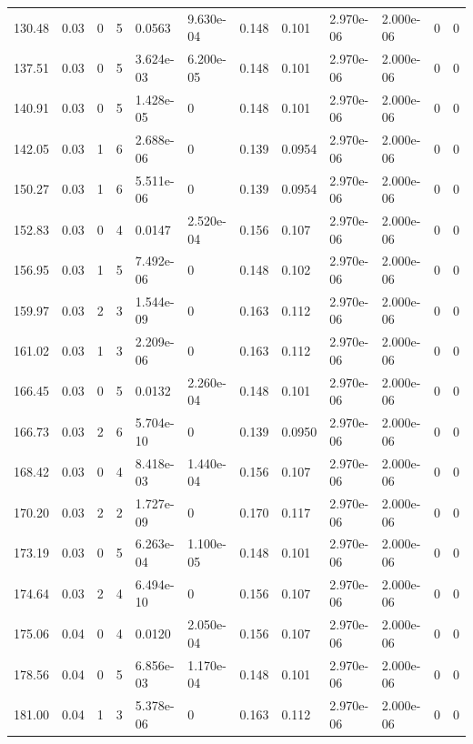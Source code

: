 \documentclass[preview]{standalone}
\begin{document}
{{{\begin{tabular}{L{1.2cm}C{1.2cm} C{0.3cm}C{0.5cm} C{1.4cm}C{1.4cm} C{1.4cm}C{1.4cm} C{1.6cm}C{1.6cm} C{1.6cm}C{1.6cm}}
  130.48  &  0.03  & 0     &  5 &  0.0563  & 9.630e-04  &  0.148&   0.101& 2.970e-06 & 2.000e-06   &  0 & 0  \\ 
  137.51  &  0.03  & 0     &  5 &  3.624e-03  & 6.200e-05  &  0.148&   0.101& 2.970e-06 & 2.000e-06   &  0 & 0  \\ 
  140.91  &  0.03  & 0     &  5 &  1.428e-05  & 0  &  0.148&   0.101& 2.970e-06 & 2.000e-06   &  0 & 0  \\ 
  142.05  &  0.03  & 1     &  6 &  2.688e-06  & 0  &  0.139&   0.0954& 2.970e-06 & 2.000e-06   &  0 & 0  \\ 
  150.27  &  0.03  & 1     &  6 &  5.511e-06  & 0  &  0.139&   0.0954& 2.970e-06 & 2.000e-06   &  0 & 0  \\ 
  152.83  &  0.03  & 0     &  4 &  0.0147  & 2.520e-04  &  0.156&   0.107& 2.970e-06 & 2.000e-06   &  0 & 0  \\ 
  156.95  &  0.03  & 1     &  5 &  7.492e-06  & 0  &  0.148&   0.102& 2.970e-06 & 2.000e-06   &  0 & 0  \\ 
  159.97  &  0.03  & 2     &  3 &  1.544e-09  & 0  &  0.163&   0.112& 2.970e-06 & 2.000e-06   &  0 & 0  \\ 
  161.02  &  0.03  & 1     &  3 &  2.209e-06  & 0  &  0.163&   0.112& 2.970e-06 & 2.000e-06   &  0 & 0  \\ 
  166.45  &  0.03  & 0     &  5 &  0.0132  & 2.260e-04  &  0.148&   0.101& 2.970e-06 & 2.000e-06   &  0 & 0  \\ 
  166.73  &  0.03  & 2     &  6 &  5.704e-10  & 0  &  0.139&   0.0950& 2.970e-06 & 2.000e-06   &  0 & 0  \\ 
  168.42  &  0.03  & 0     &  4 &  8.418e-03  & 1.440e-04  &  0.156&   0.107& 2.970e-06 & 2.000e-06   &  0 & 0  \\ 
  170.20  &  0.03  & 2     &  2 &  1.727e-09  & 0  &  0.170&   0.117& 2.970e-06 & 2.000e-06   &  0 & 0  \\ 
  173.19  &  0.03  & 0     &  5 &  6.263e-04  & 1.100e-05  &  0.148&   0.101& 2.970e-06 & 2.000e-06   &  0 & 0  \\ 
  174.64  &  0.03  & 2     &  4 &  6.494e-10  & 0  &  0.156&   0.107& 2.970e-06 & 2.000e-06   &  0 & 0  \\ 
  175.06  &  0.04  & 0     &  4 &  0.0120  & 2.050e-04  &  0.156&   0.107& 2.970e-06 & 2.000e-06   &  0 & 0  \\ 
  178.56  &  0.04  & 0     &  5 &  6.856e-03  & 1.170e-04  &  0.148&   0.101& 2.970e-06 & 2.000e-06   &  0 & 0  \\ 
  181.00  &  0.04  & 1     &  3 &  5.378e-06  & 0  &  0.163&   0.112& 2.970e-06 & 2.000e-06   &  0 & 0  \\ 

\end{tabular}}}}
\end{document}
